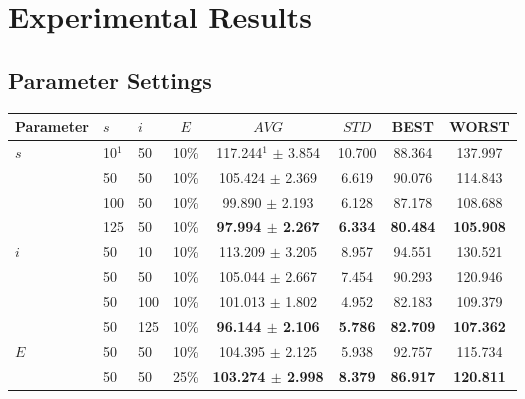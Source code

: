 \chapter{Experimental Results}
\label{appendixC}

\section{Parameter Settings}

\begin{table}
    \centering
    \begin{tabular}{|l|l|l|c||c|c|c|c|}
    \hline
    Parameter & $s$ & $i$ & $E$ & $AVG$ & $STD$ & BEST & WORST \\
    \hline
    $s$ & 10$^1$ & 50 & 10\% & 117.244$^1$ $\pm$ 3.854 & 10.700 & 88.364 & 137.997\\
    ~ & 50 & 50 & 10\% & 105.424 $\pm$ 2.369 & 6.619 & 90.076 & 114.843\\
    ~ & 100 & 50 & 10\% & 99.890 $\pm$ 2.193 & 6.128 & 87.178 & 108.688\\
    ~ & 125 & 50 & 10\% & \textbf{97.994 $\pm$ 2.267} & \textbf{6.334} & \textbf{80.484} & \textbf{105.908}\\
    \hline
    $i$ & 50 & 10 & 10\% & 113.209 $\pm$ 3.205 & 8.957 & 94.551 & 130.521\\
    ~ & 50 & 50 & 10\% & 105.044 $\pm$ 2.667 & 7.454 & 90.293 & 120.946\\
    ~ & 50 & 100 & 10\% & 101.013 $\pm$ 1.802 & 4.952 & 82.183 & 109.379\\
    ~ & 50 & 125 & 10\% & \textbf{96.144 $\pm$ 2.106} & \textbf{5.786} & \textbf{82.709} & \textbf{107.362}\\
    \hline
    $E$ & 50 & 50 & 10\% & 104.395 $\pm$ 2.125 & 5.938 & 92.757 & 115.734\\
    ~ & 50 & 50 & 25\% & \textbf{103.274 $\pm$ 2.998} & \textbf{8.379} & \textbf{86.917} & \textbf{120.811}\\

\end{tabular}
\end{table}
